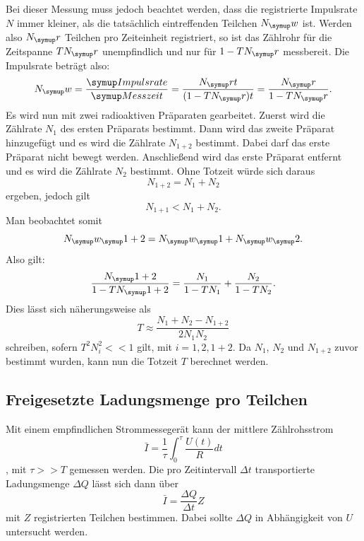 Bei dieser Messung muss jedoch beachtet werden, dass die registrierte Impulsrate $N$
immer kleiner, als die tatsächlich eintreffenden Teilchen $N_\su{w}$ ist.
Werden also $N_\su{r}$ Teilchen pro Zeiteinheit registriert, so ist das Zählrohr für
die Zeitspanne $TN_\su{r}$ unempfindlich und nur für $1-TN_\su{r}$ messbereit.
Die Impulsrate beträgt also:
\begin{equation}
  N_\su{w} = \frac{\su{Impulsrate}}{\su{Messzeit}} = \frac{N_\su{r}t}{(1-TN_\su{r})t} =
  \frac{N_\su{r}}{1-TN_\su{r}}.
\end{equation}
Es wird nun mit zwei radioaktiven Präparaten gearbeitet. Zuerst wird die
Zählrate $N_1$ des ersten Präparats bestimmt. Dann wird das zweite Präparat hinzugefügt
und es wird die Zählrate $N_{1+2}$ bestimmt. Dabei darf das erste Präparat nicht bewegt
werden. Anschließend wird das erste Präparat entfernt und es wird die Zählrate $N_2$
bestimmt. Ohne Totzeit würde sich daraus
\begin{equation}
  N_{1+2} = N_1 + N_2
\end{equation}
ergeben, jedoch gilt
\begin{equation}
  N_{1+1} < N_1 + N_2.
\end{equation}
Man beobachtet somit
\begin{equation}
  N_\su{w_\su{1+2}} = N_\su{w_\su{1}} + N_\su{w_\su{2}}.
\end{equation}
Also gilt:
\begin{equation}
  \frac{N_\su{1+2}}{1-TN_\su{1+2}} = \frac{N_1}{1-TN_1} + \frac{N_2}{1-TN_2}.
\end{equation}
Dies lässt sich näherungsweise als
\begin{equation}
  T \approx \frac{N_1 + N_2 - N_{1+2}}{2N_1 N_2}
\end{equation}
schreiben, sofern $T^2N_i^2 << 1$ gilt, mit $ i = 1, 2, 1+2$.
Da $N_1$, $N_2$ und $N_{1+2}$ zuvor bestimmt wurden, kann nun die Totzeit $T$
berechnet werden.

\subsection{Freigesetzte Ladungsmenge pro Teilchen}
Mit einem empfindlichen Strommessegerät kann der mittlere Zählrohsstrom
\begin{equation}
  \bar{I} = \frac{1}{\tau} \int_0^{\tau} \frac{U(t)}{R}dt
\end{equation}
, mit $\tau >> T$ gemessen werden.
Die pro Zeitintervall $\Delta t$ transportierte Ladungsmenge $\Delta Q$
lässt sich dann über
\begin{equation}
  \bar{I} = \frac{\Delta Q} {\Delta t} Z
\end{equation}
mit $Z$ registrierten Teilchen bestimmen. Dabei sollte $\Delta Q$ in Abhängigkeit
von $U$ untersucht werden.

